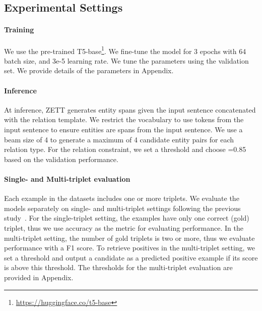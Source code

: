 \subsection{Experimental Settings}
\paragraph{Training}
We use the pre-trained T5-base\footnote{\url{https://huggingface.co/t5-base}}.
We fine-tune the model for 3 epochs with 64  batch size, and 3e-5 learning rate. We tune the parameters using the validation set. We provide details of the parameters in Appendix.

\paragraph{Inference}

At inference, ZETT generates entity spans given the input sentence concatenated with the relation template. We restrict the vocabulary to use tokens from the input sentence to ensure entities are spans from the input sentence.
We use a beam size of 4 to generate a maximum of 4 candidate entity pairs for each relation type. 
For the relation constraint, we set a threshold  and choose =0.85 based on the validation performance. 

\paragraph{Single- and Multi-triplet evaluation}
Each example in the datasets includes one or more triplets. We evaluate the models separately on single- and multi-triplet settings following the previous study~\cite{chia-etal-2022-relationprompt}. For the single-triplet setting, the examples have only one correct (gold) triplet, thus we use accuracy as the metric for evaluating performance.
In the multi-triplet setting, the number of gold triplets is two or more, thus we evaluate performance with a F1 score.
To retrieve positives in the multi-triplet setting, we set a threshold and output a candidate as a predicted positive example if its score is above this threshold. The thresholds for the multi-triplet evaluation are provided in Appendix.

